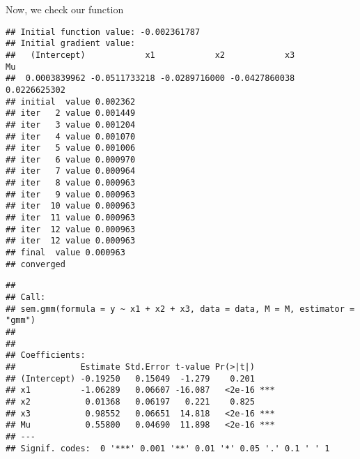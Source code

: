\begin{knitrout}
\begin{kframe}
\begin{alltt}
  \hlstd{(}\hlstd{)}
  \hlopt{$}    \hlstd{=} \hlstd{,}  \hlstd{=} \hlstd{)}
  \hlstd{(}\hlstd{)}
\hlstd{\}}
\end{alltt}
\end{kframe}
\end{knitrout}

Now, we check our function
\begin{knitrout}
\color{fgcolor}\begin{kframe}
\begin{alltt}
 \hlkwb{<-}  \hlopt{~}  \hlopt{+}  \hlopt{+}   
                     \hlstd{=} \hlstd{)}
\end{alltt}
\begin{verbatim}
## Initial function value: -0.002361787 
## Initial gradient value:
##   (Intercept)            x1            x2            x3            Mu 
##  0.0003839962 -0.0511733218 -0.0289716000 -0.0427860038  0.0226625302 
## initial  value 0.002362 
## iter   2 value 0.001449
## iter   3 value 0.001204
## iter   4 value 0.001070
## iter   5 value 0.001006
## iter   6 value 0.000970
## iter   7 value 0.000964
## iter   8 value 0.000963
## iter   9 value 0.000963
## iter  10 value 0.000963
## iter  11 value 0.000963
## iter  12 value 0.000963
## iter  12 value 0.000963
## final  value 0.000963 
## converged
\end{verbatim}
\begin{alltt}
  \hlstd{=} \hlstd{)}
\end{alltt}
\begin{verbatim}
## 
## Call:
## sem.gmm(formula = y ~ x1 + x2 + x3, data = data, M = M, estimator = "gmm")
## 
## 
## Coefficients:
##             Estimate Std.Error t-value Pr(>|t|)    
## (Intercept) -0.19250   0.15049  -1.279    0.201    
## x1          -1.06289   0.06607 -16.087   <2e-16 ***
## x2           0.01368   0.06197   0.221    0.825    
## x3           0.98552   0.06651  14.818   <2e-16 ***
## Mu           0.55800   0.04690  11.898   <2e-16 ***
## ---
## Signif. codes:  0 '***' 0.001 '**' 0.01 '*' 0.05 '.' 0.1 ' ' 1
\end{verbatim}

\end{kframe}
\end{knitrout}
